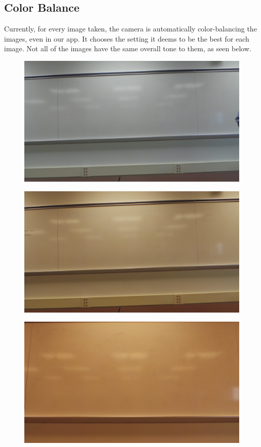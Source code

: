 \documentclass[]{article}
\begin{document}
		\subsection*{Color Balance}
		Currently, for every image taken, the camera is automatically color-balancing the images, even in our app.  It chooses the setting it deems to be the best for each image.  Not all of the images have the same overall tone  to them, as seen below.  
\begin{figure}[H]
\centering
\includegraphics[scale=0.1]{images/colorbalance_1}

\end{figure}
		
\begin{figure}[H]
\centering
\includegraphics[scale=0.1]{images/colorbalance_2}

\end{figure}	
		
\begin{figure}[H]
\centering
\includegraphics[scale=0.1]{images/colorbalance_3}

\end{figure}		
\end{document}

